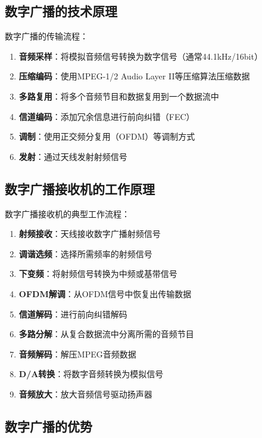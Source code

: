 \subsection{数字广播的技术原理}
\label{sec:digital_broadcast_tech}

数字广播的传输流程：

\begin{enumerate}
    \item \textbf{音频采样}：将模拟音频信号转换为数字信号（通常44.1kHz/16bit）
    \item \textbf{压缩编码}：使用MPEG-1/2 Audio Layer II等压缩算法压缩数据
    \item \textbf{多路复用}：将多个音频节目和数据复用到一个数据流中
    \item \textbf{信道编码}：添加冗余信息进行前向纠错（FEC）
    \item \textbf{调制}：使用正交频分复用（OFDM）等调制方式
    \item \textbf{发射}：通过天线发射射频信号
\end{enumerate}

\subsection{数字广播接收机的工作原理}
\label{sec:digital_receiver_principle}

数字广播接收机的典型工作流程：

\begin{enumerate}
    \item \textbf{射频接收}：天线接收数字广播射频信号
    \item \textbf{调谐选频}：选择所需频率的射频信号
    \item \textbf{下变频}：将射频信号转换为中频或基带信号
    \item \textbf{OFDM解调}：从OFDM信号中恢复出传输数据
    \item \textbf{信道解码}：进行前向纠错解码
    \item \textbf{多路分解}：从复合数据流中分离所需的音频节目
    \item \textbf{音频解码}：解压MPEG音频数据
    \item \textbf{D/A转换}：将数字音频转换为模拟信号
    \item \textbf{音频放大}：放大音频信号驱动扬声器
\end{enumerate}

\subsection{数字广播的优势}
\label{sec:digital_broadcast_advantages}

